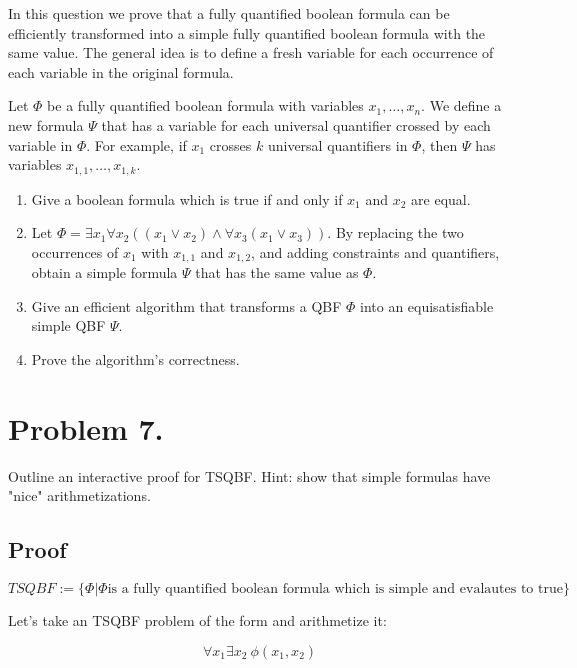 \documentclass{article}
\begin{document}
In this question we prove that a fully quantified boolean formula can be efficiently transformed into a simple fully quantified boolean formula with the same value. The general idea is to define a fresh variable for each occurrence of each variable in the original formula.

Let $\Phi$ be a fully quantified boolean formula with variables $x_1, \ldots, x_n$. We define a new formula $\Psi$ that has a variable for each universal quantifier crossed by each variable in $\Phi$. For example, if $x_1$ crosses $k$ universal quantifiers in $\Phi$, then $\Psi$ has variables $x_{1,1}, \ldots, x_{1,k}$.

\begin{enumerate}
    \item Give a boolean formula which is true if and only if $x_1$ and $x_2$ are equal.
    \item Let $\Phi = \exists x_1 \forall x_2 ((x_1 \vee x_2) \wedge \forall x_3 (x_1 \vee x_3))$. By replacing the two occurrences of $x_1$ with $x_{1,1}$ and $x_{1,2}$, and adding constraints and quantifiers, obtain a simple formula $\Psi$ that has the same value as $\Phi$.
    \item Give an efficient algorithm that transforms a QBF $\Phi$ into an equisatisfiable simple QBF $\Psi$.
    \item Prove the algorithm's correctness.
\end{enumerate}



\section*{Problem 7.}

Outline an interactive proof for TSQBF.
Hint: show that simple formulas have "nice" arithmetizations.

\subsection*{Proof}

$$
TSQBF := \{\Phi | \Phi \text{is a fully quantified boolean formula which is simple and evalautes to true}\}
$$

Let's take an TSQBF problem of the form and arithmetize it:

$$
\forall{x_{1}} \exists{x_{2}} \ \phi(x_{1}, x_{2})
$$
\end{document}
